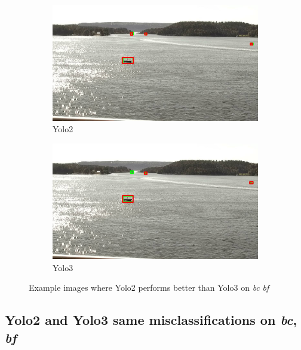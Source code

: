 \begin{figure}[h!]
\begin{subfigure}{.5\textwidth}
  \centering
  \includegraphics[width=0.9\linewidth]{results/case_buildings/yolo23/2better/yolo2/selected_08_11_frame0530.jpg}
  \caption{Yolo2}
\end{subfigure}%
\begin{subfigure}{.5\textwidth}
  \centering
  \includegraphics[width=.9\linewidth]{results/case_buildings/yolo23/2better/yolo3/selected_08_11_frame0530.jpg}
  \caption{Yolo3}
\end{subfigure}
\caption{Example images where Yolo2 performs better than Yolo3 on \textit{bc} \textit{bf}}
\label{img:yolo2_better}

\end{figure}

\newpage

\subsection{Yolo2 and Yolo3 same misclassifications on \textit{bc}, \textit{bf}}
\label{sec:same_mistake}

